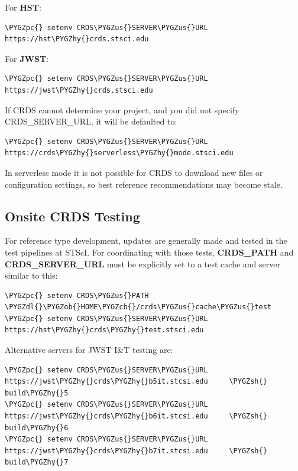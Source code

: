 \documentclass[letterpaper,10pt,english]{sphinxmanual}
\def\PYGZus{\char`\_}
\def\PYGZob{\char`\{}
\def\PYGZcb{\char`\}}
\def\PYGZsh{\char`\#}
\def\PYGZpc{\char`\%}
\def\PYGZdl{\char`\$}
\def\PYGZhy{\char`\-}
\begin{document}
For \textbf{HST}:

\begin{Verbatim}[commandchars=\\\{\}]
\PYGZpc{} setenv CRDS\PYGZus{}SERVER\PYGZus{}URL https://hst\PYGZhy{}crds.stsci.edu
\end{Verbatim}

For \textbf{JWST}:

\begin{Verbatim}[commandchars=\\\{\}]
\PYGZpc{} setenv CRDS\PYGZus{}SERVER\PYGZus{}URL https://jwst\PYGZhy{}crds.stsci.edu
\end{Verbatim}

If CRDS cannot determine your project,  and you did not specify CRDS\_SERVER\_URL,  it will be defaulted to:

\begin{Verbatim}[commandchars=\\\{\}]
\PYGZpc{} setenv CRDS\PYGZus{}SERVER\PYGZus{}URL https://crds\PYGZhy{}serverless\PYGZhy{}mode.stsci.edu
\end{Verbatim}

In serverless mode it is not possible for CRDS to download new files or configuration settings,
so best reference recommendations may become stale.


\subsection{Onsite CRDS Testing}
\label{installation:onsite-crds-testing}
For reference type development,  updates are generally made and tested in the test pipelines at STScI.  For
coordinating with those tests,  \textbf{CRDS\_PATH} and \textbf{CRDS\_SERVER\_URL} must be explicitly set to a test cache and server
similar to this:

\begin{Verbatim}[commandchars=\\\{\}]
\PYGZpc{} setenv CRDS\PYGZus{}PATH  \PYGZdl{}\PYGZob{}HOME\PYGZcb{}/crds\PYGZus{}cache\PYGZus{}test
\PYGZpc{} setenv CRDS\PYGZus{}SERVER\PYGZus{}URL https://hst\PYGZhy{}crds\PYGZhy{}test.stsci.edu
\end{Verbatim}

Alternative servers for JWST I\&T testing are:

\begin{Verbatim}[commandchars=\\\{\}]
\PYGZpc{} setenv CRDS\PYGZus{}SERVER\PYGZus{}URL https://jwst\PYGZhy{}crds\PYGZhy{}b5it.stcsi.edu     \PYGZsh{} build\PYGZhy{}5
\PYGZpc{} setenv CRDS\PYGZus{}SERVER\PYGZus{}URL https://jwst\PYGZhy{}crds\PYGZhy{}b6it.stcsi.edu     \PYGZsh{} build\PYGZhy{}6
\PYGZpc{} setenv CRDS\PYGZus{}SERVER\PYGZus{}URL https://jwst\PYGZhy{}crds\PYGZhy{}b7it.stcsi.edu     \PYGZsh{} build\PYGZhy{}7
\end{Verbatim}
\end{document}
